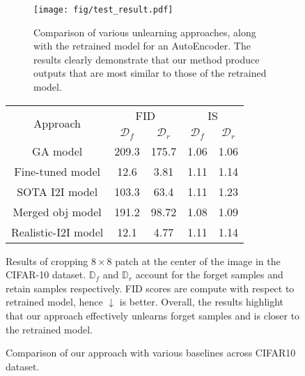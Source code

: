 \begin{figure*}
  \centering
  \begin{subfigure}{0.58\linewidth}
    \texttt{[image: fig/test\_result.pdf]}
    \caption{Comparison of various unlearning approaches, along with the retrained model for an AutoEncoder. The results clearly demonstrate that our method  produce outputs that are most similar to those of the retrained model.}
    \label{fig:res_CIFAR10_orig}
  \end{subfigure}
  \hfill
  \begin{minipage}{0.40\linewidth}
    \centering
    \vspace{-19em}
    \begin{tabular}{ccccc}
      \toprule
      \multirow{2}{*}{Approach} & \multicolumn{2}{c}{FID} & \multicolumn{2}{c}{IS} \\ \cline{2-5}
      & $\mathcal{D}_f$ & $\mathcal{D}_r$ & $\mathcal{D}_f$ & $\mathcal{D}_r$ \\
      \hline
      GA model & 209.3 & 175.7 & 1.06 & 1.06 \\
      Fine-tuned model & 12.6 & 3.81 & 1.11 & 1.14 \\
      SOTA I2I model & 103.3 & 63.4 & 1.11 & 1.23 \\
      Merged obj model & 191.2 & 98.72 & 1.08 & 1.09 \\
      Realistic-I2I model & 12.1 & 4.77 & 1.11 & 1.14 \\
      \bottomrule
    \end{tabular}
    \caption{Results of cropping $8 \times 8$ patch at the center of the image in the CIFAR-10 dataset. $\mathbb{D}_f$ and $\mathbb{D}_r$ account for the forget samples and retain samples respectively. FID scores are compute with respect to retrained model, hence $\downarrow$ is better. Overall, the results highlight that our approach effectively unlearns forget samples and is closer to the retrained model.}
    \label{tab:CIFAR10_orig_res}
  \end{minipage}
  \caption{Comparison of our approach with various baselines across CIFAR10 dataset.}
  \label{fig:2col_image}
\end{figure*}

